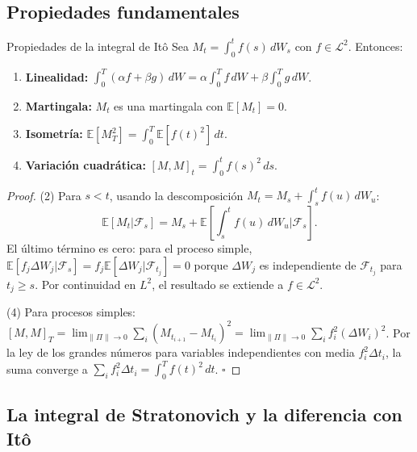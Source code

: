 \subsection{Propiedades fundamentales}
\label{subsec:propiedades_ito}

\begin{proposicion}{Propiedades de la integral de Itô}
\label{prop:ito_propiedades}
Sea $M_t = \int_0^t f(s)\,dW_s$ con $f \in \mathcal{L}^2$. Entonces:
\begin{enumerate}
  \item \textbf{Linealidad:} $\int_0^T(\alpha f+\beta g)\,dW
        = \alpha\int_0^T f\,dW + \beta\int_0^T g\,dW$.
  \item \textbf{Martingala:} $M_t$ es una martingala con $\mathbb{E}[M_t] = 0$.
  \item \textbf{Isometría:} $\mathbb{E}[M_T^2] = \int_0^T\mathbb{E}[f(t)^2]\,dt$.
  \item \textbf{Variación cuadrática:} $[M,M]_t = \int_0^t f(s)^2\,ds$.
\end{enumerate}
\end{proposicion}

\begin{proof}
(2) Para $s < t$, usando la descomposición $M_t = M_s + \int_s^t f(u)\,dW_u$:
\[
  \mathbb{E}[M_t|\mathcal{F}_s]
  = M_s + \mathbb{E}\!\left[\int_s^t f(u)\,dW_u \Big|\mathcal{F}_s\right].
\]
El último término es cero: para el proceso simple, $\mathbb{E}[f_j\Delta W_j|
\mathcal{F}_s] = f_j\mathbb{E}[\Delta W_j|\mathcal{F}_{t_j}] = 0$ porque
$\Delta W_j$ es independiente de $\mathcal{F}_{t_j}$ para $t_j \geq s$. Por
continuidad en $L^2$, el resultado se extiende a $f \in \mathcal{L}^2$.

(4) Para procesos simples: $[M,M]_T = \lim_{\|\Pi\|\to 0} \sum_i(M_{t_{i+1}}
-M_{t_i})^2 = \lim_{\|\Pi\|\to 0}\sum_i f_i^2(\Delta W_i)^2$. Por la
ley de los grandes números para variables independientes con media $f_i^2\Delta t_i$,
la suma converge a $\sum_i f_i^2\Delta t_i = \int_0^T f(t)^2\,dt$. $\square$
\end{proof}

\subsection{La integral de Stratonovich y la diferencia con Itô}
\label{subsec:stratonovich}

